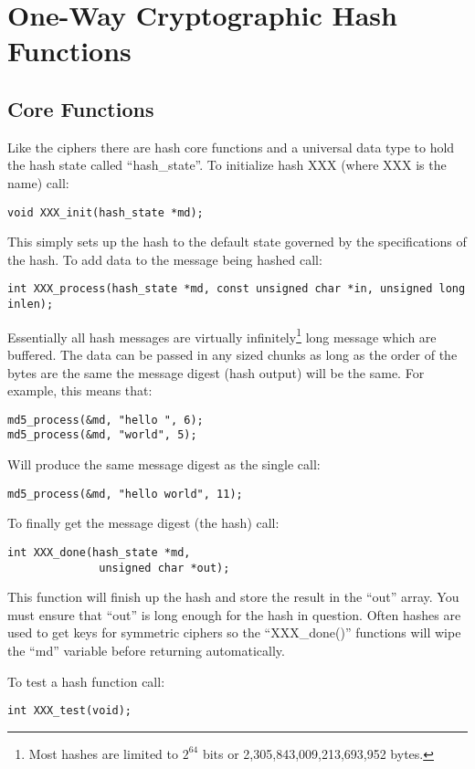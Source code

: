 \documentclass[a4paper]{book}
\begin{document}
\chapter{One-Way Cryptographic Hash Functions}
\section{Core Functions}

Like the ciphers there are hash core functions and a universal data type to hold the hash state called ``hash\_state''.  
To initialize hash XXX (where XXX is the name) call:
\begin{verbatim}
void XXX_init(hash_state *md);
\end{verbatim}

This simply sets up the hash to the default state governed by the specifications of the hash.  To add data to the 
message being hashed call:
\begin{verbatim}
int XXX_process(hash_state *md, const unsigned char *in, unsigned long inlen);
\end{verbatim}

Essentially all hash messages are virtually infinitely\footnote{Most hashes are limited to $2^{64}$ bits or 2,305,843,009,213,693,952 bytes.} long message which 
are buffered.  The data can be passed in any sized chunks as long as the order of the bytes are the same the message digest
(hash output) will be the same.  For example, this means that:
\begin{verbatim}
md5_process(&md, "hello ", 6);
md5_process(&md, "world", 5);
\end{verbatim}
Will produce the same message digest as the single call:
\begin{verbatim}
md5_process(&md, "hello world", 11);
\end{verbatim}

To finally get the message digest (the hash) call:
\begin{verbatim}
int XXX_done(hash_state *md, 
              unsigned char *out);
\end{verbatim}

This function will finish up the hash and store the result in the ``out'' array.  You must ensure that ``out'' is long
enough for the hash in question.  Often hashes are used to get keys for symmetric ciphers so the ``XXX\_done()'' functions
will wipe the ``md'' variable before returning automatically.

To test a hash function call:
\begin{verbatim}
int XXX_test(void);
\end{verbatim}
\end{document}
